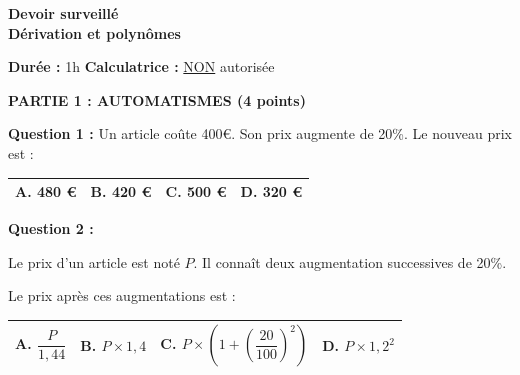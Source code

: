 \documentclass[12pt,a4paper]{exam}
\begin{document}
\begin{center}
    \Large\textbf{Devoir surveillé\\Dérivation et polynômes}
\end{center}

\vspace{0.3cm}

\noindent
\textbf{Durée :} 1h \hfill
\textbf{Calculatrice :} \underline{NON} autorisée

\vspace{0.5cm}

\noindent
\textbf{\large{PARTIE 1 : AUTOMATISMES (4 points)}}

\vspace{10pt}

\textbf{Question 1 :}
\vspace{5pt}
Un article coûte 400€. Son prix augmente de 20\%. Le nouveau prix est : 

\begin{center}
    \renewcommand{\arraystretch}{3}
    \begin{tabular}{|m{3.4cm}|m{3.4cm}|m{3.4cm}|m{3.4cm}|}
    \hline
    \centering \vspace{-0.3cm} \textbf{A.} 480 € & 
    \centering \vspace{-0.3cm} \textbf{B.} 420 € & 
    \centering \vspace{-0.3cm} \textbf{C.} 500 € & 
    \centering \vspace{-0.3cm} \textbf{D.} 320 € \tabularnewline
    \hline
    \end{tabular}
\end{center}

\vspace{10pt}

\textbf{Question 2 :}
\vspace{5pt}

Le prix d'un article est noté $P$. Il connaît deux augmentation successives de 20\%.

Le prix après ces augmentations est :

\noindent
\begin{center}
    \renewcommand{\arraystretch}{3}
    \begin{tabular}{|m{3.2cm}|m{3.4cm}|m{4.5cm}|m{3.4cm}|}
    \hline
    \centering \vspace{-0.3cm} \textbf{A.} $\dfrac{P}{1,44}$ & 
    \centering \vspace{-0.3cm} \textbf{B.} $P \times 1,4$ & 
    \centering \vspace{-0.3cm} \textbf{C.} $P \times \left(1+\left(\dfrac{20}{100}\right)^2\right)$ & 
    \centering \vspace{-0.3cm} \textbf{D.} $P \times 1,2^2$ \tabularnewline
    \hline
    \end{tabular}
\end{center}
\end{document}
